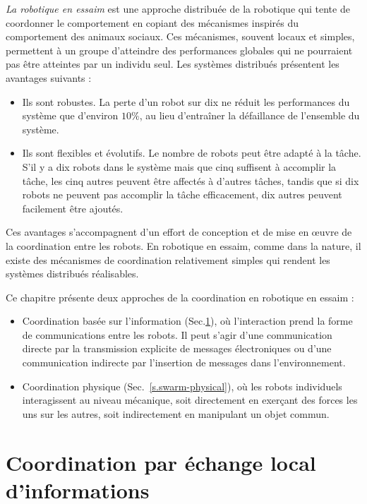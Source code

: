 \emph{La robotique en essaim} est une approche distribuée de la robotique qui tente de coordonner le comportement en copiant des mécanismes inspirés du comportement des animaux sociaux. Ces mécanismes, souvent locaux et simples, permettent à un groupe d'atteindre des performances globales qui ne pourraient pas être atteintes par un individu seul. Les systèmes distribués présentent les avantages suivants :
\begin{itemize}
\item Ils sont robustes. La perte d'un robot sur dix ne réduit les performances du système que d'environ $10\%$, au lieu d'entraîner la défaillance de l'ensemble du système.
\item Ils sont flexibles et évolutifs. Le nombre de robots peut être adapté à la tâche. S'il y a dix robots dans le système mais que cinq suffisent à accomplir la tâche, les cinq autres peuvent être affectés à d'autres tâches, tandis que si dix robots ne peuvent pas accomplir la tâche efficacement, dix autres peuvent facilement être ajoutés.
\end{itemize}
Ces avantages s'accompagnent d'un effort de conception et de mise en œuvre de la coordination entre les robots. En robotique en essaim, comme dans la nature, il existe des mécanismes de coordination relativement simples qui rendent les systèmes distribués réalisables.

Ce chapitre présente deux approches de la coordination en robotique en essaim : \begin{itemize}
\item Coordination basée sur l'information (Sec.\ref{s.swarm-info}), où l'interaction prend la forme de communications entre les robots. Il peut s'agir d'une communication directe par la transmission explicite de messages électroniques ou d'une communication indirecte par l'insertion de messages dans l'environnement.
\item Coordination physique (Sec.~\ref{s.swarm-physical}), où les robots individuels interagissent au niveau mécanique, soit directement en exerçant des forces les uns sur les autres, soit indirectement en manipulant un objet commun.
\end{itemize}

\section{Coordination par échange local d'informations}\label{s.swarm-info}

